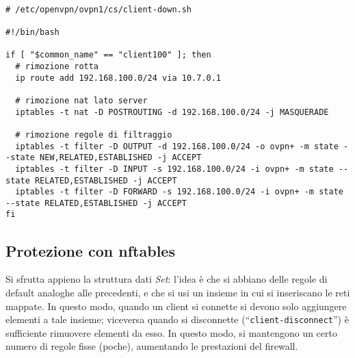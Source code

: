 		\begin{verbatim}
			
# /etc/openvpn/ovpn1/cs/client-down.sh
			        
#!/bin/bash
			             
if [ "$common_name" == "client100" ]; then
  # rimozione rotta
  ip route add 192.168.100.0/24 via 10.7.0.1
			
  # rimozione nat lato server
  iptables -t nat -D POSTROUTING -d 192.168.100.0/24 -j MASQUERADE
			        
  # rimozione regole di filtraggio
  iptables -t filter -D OUTPUT -d 192.168.100.0/24 -o ovpn+ -m state --state NEW,RELATED,ESTABLISHED -j ACCEPT
  iptables -t filter -D INPUT -s 192.168.100.0/24 -i ovpn+ -m state --state RELATED,ESTABLISHED -j ACCEPT
  iptables -t filter -D FORWARD -s 192.168.100.0/24 -i ovpn+ -m state --state RELATED,ESTABLISHED -j ACCEPT
fi
		\end{verbatim}
		
		\subsection{Protezione con nftables}
		Si sfrutta appieno la struttura dati \textit{Set}: l'idea è che si abbiano
		delle regole di default analoghe alle precedenti, e che si usi un insieme
		in cui si inseriscano le reti mappate. In questo modo, quando un client si
		connette si devono solo aggiungere elementi a tale insieme; viceversa quando
		si disconnette (``\texttt{client-disconnect}'') è sufficiente rimuovere
		elementi da esso.
		In questo modo, si mantengono un certo numero di regole fisse (poche),
		aumentando le prestazioni del firewall.
		
